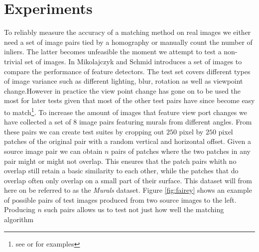 \documentclass[12pt,journal,compsoc]{IEEEtran}
\begin{document}
\section{Experiments}
\label{experiment}
%
To reliably measure the accuracy of a matching method on real images we 
either need a set of image pairs tied by a homography or manually count 
the number of inliers. The latter becomes unfeasible the moment we 
attempt to test a non-trivial set of images. In 
\cite{mikolajczyk2005performance} Mikolajczyk and Schmid introduces a 
set of images to compare the performance of feature detectors. The test 
set covers different types of image variance such as different lighting, 
blur, rotation as well as viewpoint change.However in practice the view 
point change has gone on to be used the most for later tests given that 
most of the other test pairs have since become easy to 
match\footnote{see \cite{wu2011robust} or \cite{delponte2006svd} for 
examples}.
%
%
To increase the amount of images that feature view port changes we have 
collected a set of $8$ image pairs featuring murals from different 
angles.  From these pairs we can create test suites by cropping out 
$250$ pixel by $250$ pixel patches of the original pair with a random 
vertical and horizontal offset. Given a source image pair we can obtain 
$n$ pairs of patches where the two patches in any pair might or might 
not overlap.  This ensures that the patch pairs whith no overlap still 
retain a basic similarity to each other, while the patches that do 
overlap often only overlap on a small part of their surface. This 
dataset will from here on be referred to as the \emph{Murals} dataset.  
Figure \ref{fig:fairey} shows an example of possible pairs of test 
images produced from two source images to the left.  Producing $n$ such 
pairs allows us to test not just how well the matching algorithm 
\end{document}

